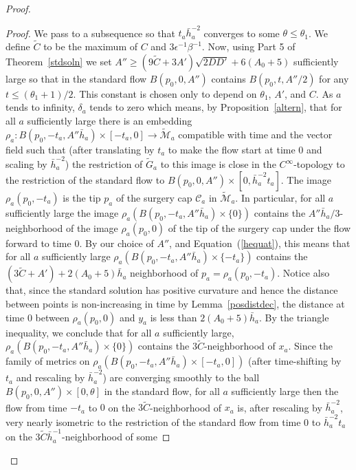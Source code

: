 \begin{proof}
\begin{proof}
We pass to a subsequence so that $t_a\bar h_a^{-2}$ converges to
some $\theta\le \theta_1$. We define $\widetilde C$ to be the
maximum of $C$ and $3\epsilon^{-1}\beta^{-1}$. Now, using Part 5 of
Theorem~\ref{stdsoln} we set $A''\ge (9\widetilde
C+3A')\sqrt{2DD'}+6(A_0+5)$ sufficiently large so that in the
 standard flow $B(p_0,0,A'')$ contains
$B(p_0,t,A''/2)$ for any $t\le (\theta_1+1)/2$. This constant is chosen only to
depend on $\theta_1$, $A'$, and $C$. As $a$ tends to infinity, $\delta_a$ tends
to zero which means, by Proposition~\ref{altern}, that for all $a$ sufficiently
large there is an embedding $\rho_a\colon B(p_0,-t_a,A''\bar h_a)\times
[-t_a,0]\to \widetilde {\mathcal M}_a$ compatible with time and the vector
field such that (after translating by $t_a$ to make the flow start at time $0$
and scaling by $\bar h_a^{-2}$) the restriction of $\widetilde G_a$ to this
image is close in the $C^\infty$-topology to the restriction of the standard
flow to $B(p_0,0,A'')\times [0,\bar h_a^{-2}t_a]$. The image $\rho_a(p_0,-t_a)$
is the tip $p_a$ of the surgery cap ${\mathcal C}_a$ in $\widetilde {\mathcal
M}_a$. In particular, for all $a$ sufficiently large the image
$\rho_a\left(B(p_0,-t_a,A''\bar h_a)\times\{0\}\right)$ contains the $A''\bar
h_a/3$-neighborhood of the image $\rho_a(p_0,0)$ of the tip of the surgery cap
under the flow forward to  time $0$. By our choice of $A''$, and
Equation~(\ref{hequat}), this means that for all $a$ sufficiently large
$\rho_a\left(B(p_0,-t_a,A''\bar h_a)\times\{-t_a\}\right)$ contains the
$(3\widetilde C+A') +2(A_0+5)\bar h_a$ neighborhood of $p_a=\rho_a(p_0,-t_a)$.
Notice also that, since the standard solution has positive curvature and hence
the distance between points is non-increasing in time by
Lemma~\ref{posdistdec}, the distance at time $0$ between $\rho_a(p_0,0)$ and
$y_a$ is less than $2(A_0+5)\bar h_a$. By the triangle inequality, we conclude
that for all $a$ sufficiently large, $\rho_a\left(B(p_0,-t_a,A''\bar h_a)\times
\{0\}\right)$ contains the $3\widetilde C$-neighborhood of $x_a$. Since the
family of metrics on $\rho_a\left(B(p_0,-t_a,A''\bar h_a)\times
[-t_a,0]\right)$ (after time-shifting by $t_a$ and rescaling by $\bar
h_a^{-2}$) are converging smoothly to the ball $B(p_0,0,A'')\times [0,\theta]$
in the standard flow,
 for all $a$ sufficiently large then the flow from time $-t_a$ to $0$ on the
$3\widetilde C$-neighborhood of $x_a$ is, after rescaling by $\bar
h_a^{-2}$,
 very nearly isometric to the restriction of the standard flow from time $0$ to $\bar h^{-2}_at_a$ on
 the $3\widetilde C\bar h_a^{-1}$-neighborhood of some

\end{proof}
\end{proof}
